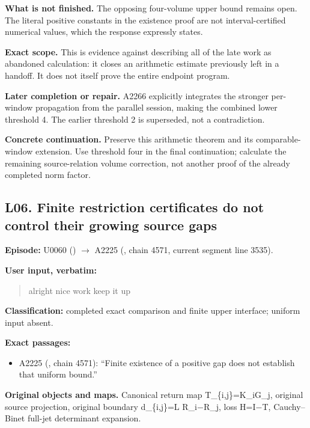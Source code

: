 \textbf{What is not finished.} The opposing four-volume upper bound
remains open. The literal positive constants in the existence proof are
not interval-certified numerical values, which the response expressly
states.

\textbf{Exact scope.} This is evidence against describing all of the
late work as abandoned calculation: it closes an arithmetic estimate
previously left in a handoff. It does not itself prove the entire
endpoint program.

\textbf{Later completion or repair.} A2266 explicitly integrates the
stronger per-window propagation from the parallel session, making the
combined lower threshold 4. The earlier threshold 2 is superseded, not a
contradiction.

\textbf{Concrete continuation.} Preserve this arithmetic theorem and its
comparable-window extension. Use threshold four in the final
continuation; calculate the remaining source-relation volume correction,
not another proof of the already completed norm factor.

\subsection{L06. Finite restriction certificates do not control their
growing source
gaps}\label{TranscriptLedgerStage:l06.-finite-restriction-certificates-do-not-control-their-growing-source-gaps}

\textbf{Episode:} U0060
(\protect{})
\allowbreak{}\ensuremath{→}\allowbreak{} A2225
(\protect{}, chain 4571,
current segment line 3535).

\textbf{User input, verbatim:}

\begin{quote}
alright nice work keep it up
\end{quote}

\textbf{Classification:} completed exact comparison and finite upper
interface; uniform input absent.

\textbf{Exact passages:}

\begin{itemize}
\tightlist
\item
  A2225 (\protect{}, chain
  4571): ``Finite existence of a positive gap does not establish that
  uniform bound.''
\end{itemize}

\textbf{Original objects and maps.} Canonical return map
T\_\{i,j\}=K\_iG\_j, original source projection, original boundary
d\_\{i,j\}=L R\_i\allowbreak{}\ensuremath{−}\allowbreak{}R\_j, loss
H=I\allowbreak{}\ensuremath{−}\allowbreak{}T, Cauchy--Binet full-jet
determinant expansion.

